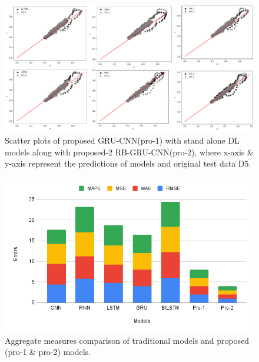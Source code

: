 \documentclass[a4paper, fleqn]{cas-sc}
\begin{document}
   \begin{figure}[h!]
    \centering
     \includegraphics[scale=.5]{d5_sp.drawio.png}
     \caption{Scatter plots of proposed GRU-CNN(pro-1) with stand alone DL models along with proposed-2 RB-GRU-CNN(pro-2), where x-axis \& y-axis represent the predictions of models and original test data D5.}
     \label{Fig:10}
   \end{figure}

   \begin{figure}[h!]
    \centering
     \includegraphics[scale=.6]{aggregator.png}
     \caption{Aggregate measures comparison of traditional models and proposed (pro-1 \& pro-2) models.}
     \label{Fig:13}
   \end{figure} 
\end{document}

